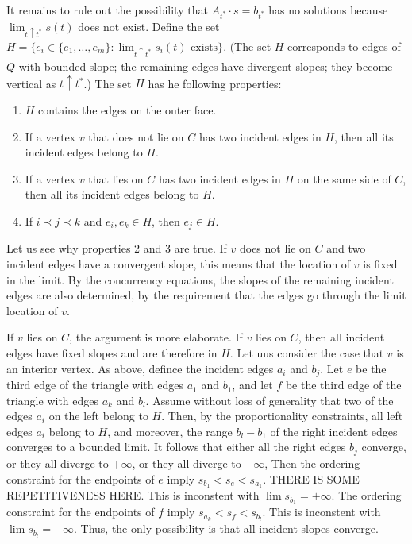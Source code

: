  It remains to rule out the possibility that
 $A_{t^*}\cdot s=b_{t^*}$ has no solutions because
   $\lim_{t\uparrow t^*} s(t)$ does not exist.  Define the set $H=\{e_i\in
   \{e_1,\ldots,e_m\}:\text{$\lim_{t\uparrow t^*} s_i(t)$ exists}\}$.
(The set $H$ corresponds to edges of $Q$
   with
   bounded slope; the remaining edges have divergent slopes; they become vertical as $t\uparrow t^*$.)
The set   $H$ has he following
   properties:
   \begin{enumerate}
    \item $H$ contains the edges
      on the outer face.
    \item
If a vertex $v$ that does not lie on $C$ has two incident edges in
$H$,
then all its incident edges belong to $H$.
    \item
If a vertex $v$ that lies on $C$ has two incident edges in
$H$ on the same side of $C$,
then all its incident edges belong to $H$.
    \item If $i \prec j \prec k$ and $e_i,e_k\in H$, 
      then $e_j\in H$.
   \end{enumerate}
Let us see why properties 2 and 3 are true.
If $v$ does not lie on $C$ and two incident edges have a convergent
slope, this means that the location of $v$ is fixed in the limit.
By the concurrency equations, the slopes of the remaining incident
edges are also determined, by the requirement that the edges go through
the limit location of $v$.

If $v$ lies on $C$, the argument is more elaborate. If $v$ lies on
$C$, then all incident edges have fixed slopes and are therefore in
$H$.
Let uus consider the case that $v$ is an interior vertex.
As above, defince the incident edges $a_i$ and $b_j$.
Let $e$ be the third edge of the triangle with edges $a_1$ and $b_1$,
and let 
 $f$ be the third edge of the triangle with edges $a_k$ and $b_l$.
Assume without loss of generality that two of the edges $a_i$ on the
left belong to $H$. Then, by the proportionality constraints, all
left edges $a_i$ belong to $H$, and moreover, the range $b_l-b_1$ of
the right incident edges converges to a bounded limit.
It follows that either all the right edges $b_j$ converge, 
or they all diverge to $+\infty$,
or they all diverge to $-\infty$,
Then the ordering constraint for the endpoints of $e$ imply
\begin{math}
  s_{b_1}<s_e<s_{a_1}
\end{math}.
THERE IS SOME REPETITIVENESS HERE.
This is inconstent with $\lim s_{b_1}=+\infty$.
The ordering constraint for the endpoints of $f$ imply
\begin{math}
  s_{a_k}<s_f<s_{b_l}
\end{math}.
This is inconstent with $\lim s_{b_l}=-\infty$.
Thus, the only possibility is that all incident slopes converge.

